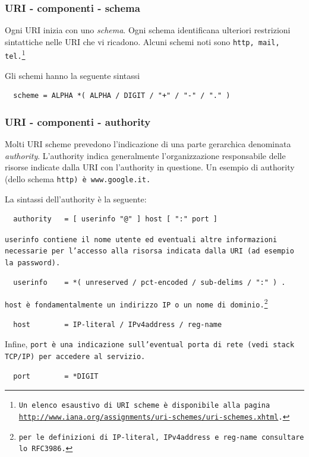 \documentclass[8pt]{beamer}
\begin{document}
\begin{frame}[fragile]
	\frametitle{URI - componenti - schema}
    Ogni URI inizia con uno \emph{schema}. Ogni schema identificana
    ulteriori restrizioni sintattiche nelle URI che vi ricadono.
    Alcuni schemi noti sono \tt{http}, \tt{mail}, \tt{tel}.\footnote{Un elenco
    esaustivo di URI scheme \`e disponibile alla pagina
    \url{http://www.iana.org/assignments/uri-schemes/uri-schemes.xhtml}.}
    \vspace{\baselineskip}
    
    Gli schemi hanno la seguente sintassi
    \begin{verbatim}
  scheme = ALPHA *( ALPHA / DIGIT / "+" / "-" / "." )
    \end{verbatim}    
\end{frame}

\begin{frame}[fragile]
	\frametitle{URI - componenti - authority}
	
	Molti URI scheme prevedono l'indicazione di una parte
	gerarchica denominata \emph{authority}. L'authority indica
	generalmente l'organizzazione responsabile delle risorse
	indicate dalla URI con l'authority in questione.
	Un esempio di authority (dello schema \tt{http}) \`e \tt{www.google.it}.
    \vspace{\baselineskip}
    
    La sintassi dell'authority \`e la seguente:
    \begin{verbatim}
  authority   = [ userinfo "@" ] host [ ":" port ]
    \end{verbatim}    

	\tt{userinfo} contiene il nome utente ed eventuali altre informazioni 
	necessarie per l'accesso alla risorsa indicata dalla URI (ad esempio la
	password).
    \begin{verbatim}
  userinfo    = *( unreserved / pct-encoded / sub-delims / ":" ) .
    \end{verbatim}    
    
    \tt{host} \`e fondamentalmente un indirizzo IP o un nome di
    dominio.\footnote{per le definizioni di \tt{IP-literal}, \tt{IPv4address} e
    \tt{reg-name} consultare lo RFC3986.}
    \begin{verbatim}
  host        = IP-literal / IPv4address / reg-name
    \end{verbatim}    
    
    Infine, \tt{port} \`e una indicazione sull'eventual porta di rete (vedi
    stack TCP/IP) per accedere al servizio.
    \begin{verbatim}
  port        = *DIGIT
    \end{verbatim}  
\end{frame}
\end{document}
